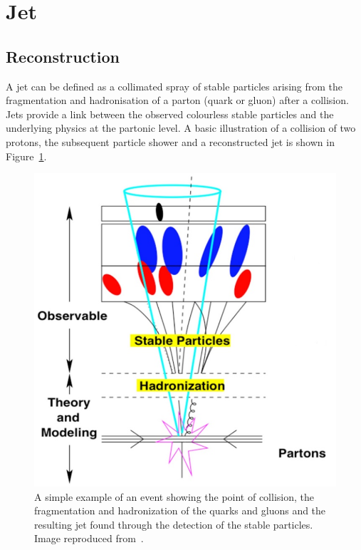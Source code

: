 \section{Jet}
\label{sec:jet} 
\subsection{Reconstruction}
\large
A jet can be defined as a collimated spray 
of stable particles arising from the fragmentation
and hadronisation of a parton (quark or gluon) after a collision.
Jets provide a link between the observed colourless 
stable particles and the underlying physics at the partonic
level. A basic illustration of a collision of two protons,
the subsequent particle shower and a reconstructed jet is 
shown in Figure~\ref{fig:jets}.

\begin{figure}[bht]
    \begin{centering}	
    \includegraphics[width=.6\textwidth]{Reconstruction/plots/Jets.jpg}
    \caption{A simple example of an event showing the point of collision, 
    the fragmentation and hadronization of the quarks and gluons and the 
    resulting jet found through the detection of the stable particles. 
    Image reproduced from~\cite{atkin2015review}.
        }
    \label{fig:jets}
    \end{centering}
\end{figure}

